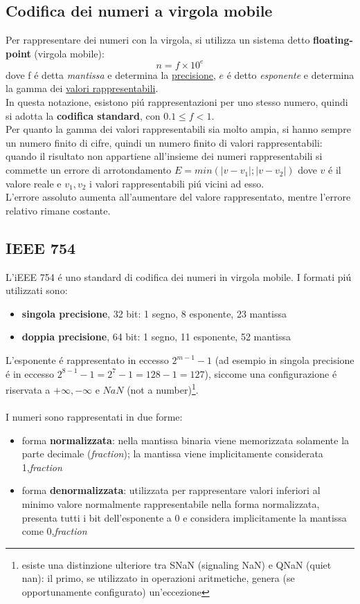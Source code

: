 \documentclass{article}
\begin{document}
\subsection{Codifica dei numeri a virgola mobile}
Per rappresentare dei numeri con la virgola, si utilizza un sistema detto \textbf{floating-point} (virgola mobile):
$$n = f \times 10^e$$
dove f é detta \textit{mantissa} e determina la \underline{precisione}, $e$ é detto \textit{esponente} e determina la gamma dei \underline{valori rappresentabili}.\\
In questa notazione, esistono piú rappresentazioni per uno stesso numero, quindi si adotta la \textbf{codifica standard}, con $0.1 \le f < 1$.\\
Per quanto la gamma dei valori rappresentabili sia molto ampia, si hanno sempre un numero finito di cifre, quindi un numero finito di valori rappresentabili: quando il risultato non appartiene all'insieme dei numeri rappresentabili si commette un errore di arrotondamento $E = min(|v-v_1|;|v-v_2|)$ dove $v$ é il valore reale e $v_1, v_2$ i valori rappresentabili piú vicini ad esso.\\
L'errore assoluto aumenta all'aumentare del valore rappresentato, mentre l'errore relativo rimane costante.

\subsection{IEEE 754}
L'iEEE 754 é uno standard di codifica dei numeri in virgola mobile. I formati piú utilizzati sono:
\begin{itemize}
	\item \textbf{singola precisione}, 32 bit: 1 segno, 8 esponente, 23 mantissa
	\item \textbf{doppia precisione}, 64 bit: 1 segno, 11 esponente, 52 mantissa
\end{itemize}
L'esponente é rappresentato in eccesso $2^{m-1}-1$ (ad esempio in singola precisione é in eccesso $2^{8-1}-1=2^7-1=128-1=127$), siccome una configurazione é riservata a $+\infty,-\infty \mbox{ e } NaN$ (not a number)\footnote{esiste una distinzione ulteriore tra SNaN (signaling NaN) e QNaN (quiet nan): il primo, se utilizzato in operazioni aritmetiche, genera (se opportunamente configurato) un'eccezione}.\\\\
I numeri sono rappresentati in due forme:
\begin{itemize}
	\item forma \textbf{normalizzata}: nella mantissa binaria viene memorizzata solamente la parte decimale (\textit{fraction}); la mantissa viene implicitamente considerata 1,\textit{fraction}
	\item forma \textbf{denormalizzata}: utilizzata per rappresentare valori inferiori al minimo valore normalmente rappresentabile nella forma normalizzata, presenta tutti i bit dell'esponente a 0 e considera implicitamente la mantissa come 0,\textit{fraction}
\end{itemize}
\end{document}
